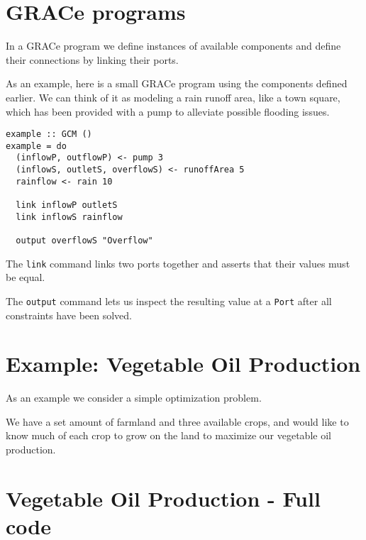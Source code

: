 \documentclass[a4paper,11pt]{article}
\begin{document}
\section{GRACe programs}
In a GRACe program we define instances of available components and
define their connections by linking their ports.

As an example, here is a small GRACe program using the components defined
earlier. We can think of it as modeling a rain runoff area, like a
town square, which has been provided with a pump to alleviate possible
flooding issues.
%
\begin{verbatim}
example :: GCM ()
example = do
  (inflowP, outflowP) <- pump 3
  (inflowS, outletS, overflowS) <- runoffArea 5
  rainflow <- rain 10

  link inflowP outletS
  link inflowS rainflow

  output overflowS "Overflow"
\end{verbatim}
The \texttt{link} command links two ports together and asserts that their values
must be equal.

The \texttt{output} command lets us inspect the resulting value at a \texttt{Port}
after all constraints have been solved.

\section{Example: Vegetable Oil Production}
As an example we consider a simple optimization problem.

We have a set amount of farmland and three available crops, and would like to
know much of each crop to grow on the land to maximize our vegetable oil production.

\appendix
\section{Vegetable Oil Production - Full code}
\inputminted[linenos]{haskell}{examples/OilCrops.hs}
\end{document}
